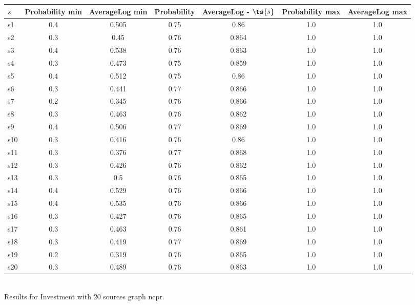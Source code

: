\documentclass{article}
\begin{document}
\noindent\begin{tabular}{|l|c|c|c|c|c|c|}
\hline
$s$& Probability min & AverageLog min & Probability & AverageLog - $\ts{s}$ & Probability max & AverageLog max\\
\hline
s1 &0.4 & 0.505 & 0.75 & 0.86 & 1.0 & 1.0\\
\hline
s2 &0.3 & 0.45 & 0.76 & 0.864 & 1.0 & 1.0\\
\hline
s3 &0.4 & 0.538 & 0.76 & 0.863 & 1.0 & 1.0\\
\hline
s4 &0.3 & 0.473 & 0.75 & 0.859 & 1.0 & 1.0\\
\hline
s5 &0.4 & 0.512 & 0.75 & 0.86 & 1.0 & 1.0\\
\hline
s6 &0.3 & 0.441 & 0.77 & 0.866 & 1.0 & 1.0\\
\hline
s7 &0.2 & 0.345 & 0.76 & 0.866 & 1.0 & 1.0\\
\hline
s8 &0.3 & 0.463 & 0.76 & 0.862 & 1.0 & 1.0\\
\hline
s9 &0.4 & 0.506 & 0.77 & 0.869 & 1.0 & 1.0\\
\hline
s10 &0.3 & 0.416 & 0.76 & 0.86 & 1.0 & 1.0\\
\hline
s11 &0.3 & 0.376 & 0.77 & 0.868 & 1.0 & 1.0\\
\hline
s12 &0.3 & 0.426 & 0.76 & 0.862 & 1.0 & 1.0\\
\hline
s13 &0.3 & 0.5 & 0.76 & 0.865 & 1.0 & 1.0\\
\hline
s14 &0.4 & 0.529 & 0.76 & 0.866 & 1.0 & 1.0\\
\hline
s15 &0.4 & 0.535 & 0.76 & 0.866 & 1.0 & 1.0\\
\hline
s16 &0.3 & 0.427 & 0.76 & 0.865 & 1.0 & 1.0\\
\hline
s17 &0.3 & 0.463 & 0.76 & 0.861 & 1.0 & 1.0\\
\hline
s18 &0.3 & 0.419 & 0.77 & 0.869 & 1.0 & 1.0\\
\hline
s19 &0.2 & 0.319 & 0.76 & 0.865 & 1.0 & 1.0\\
\hline
s20 &0.3 & 0.489 & 0.76 & 0.863 & 1.0 & 1.0\\
\hline
\end{tabular}\\

\noindent Results for Investment with 20 sources graph ncpr.
\end{document}
